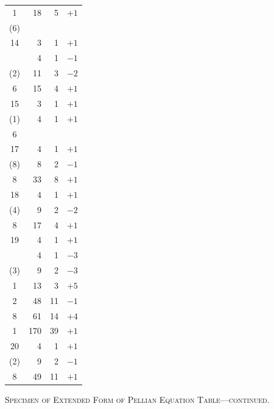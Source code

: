 \documentclass[11pt]{article}
\begin{document}
\begin{center}
\begin{tabular}{|c|r|r|r|}
1 & 18 & 5 & $+1$ \\
(6) & & & \\
\hline
14 & 3 & 1 & $+1$ \\
 & 4 & 1 & $-1$ \\
(2) & 11 & 3 & $-2$ \\
6 & 15 & 4 & $+1$ \\
\hline
15 & 3 & 1 & $+1$ \\
(1) & 4 & 1 & $+1$ \\
6 & & & \\
\hline
17 & 4 & 1 & $+1$ \\
(8) & 8 & 2 & $-1$ \\
8 & 33 & 8 & $+1$ \\
\hline
18 & 4 & 1 & $+1$ \\
(4) & 9 & 2 & $-2$ \\
8 & 17 & 4 & $+1$ \\
\hline
19 & 4 & 1 & $+1$ \\
 & 4 & 1 & $-3$ \\
(3) & 9 & 2 & $-3$ \\
1 & 13 & 3 & $+5$ \\
2 & 48 & 11 & $-1$ \\
8 & 61 & 14 & $+4$ \\
1 & 170 & 39 & $+1$ \\
\hline
20 & 4 & 1 & $+1$ \\
(2) & 9 & 2 & $-1$ \\
8 & 49 & 11 & $+1$ \\
\hline
\end{tabular}
\end{center}

\begin{center}
\small\textsc{Specimen of Extended Form of Pellian Equation Table---continued.}
\end{center}
\end{document}
